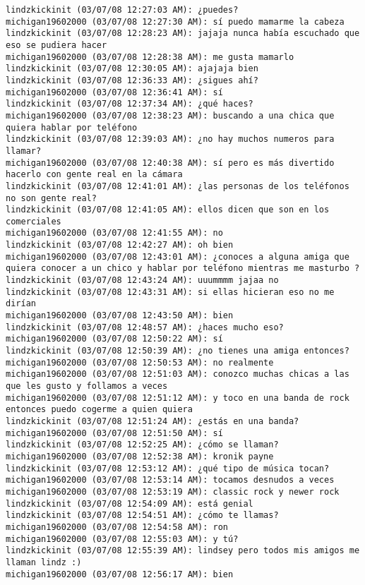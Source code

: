 \begin{verbatim}
lindzkickinit (03/07/08 12:27:03 AM): ¿puedes?
michigan19602000 (03/07/08 12:27:30 AM): sí puedo mamarme la cabeza
lindzkickinit (03/07/08 12:28:23 AM): jajaja nunca había escuchado que eso se pudiera hacer
michigan19602000 (03/07/08 12:28:38 AM): me gusta mamarlo
lindzkickinit (03/07/08 12:30:05 AM): ajajaja bien
lindzkickinit (03/07/08 12:36:33 AM): ¿sigues ahí?
michigan19602000 (03/07/08 12:36:41 AM): sí
lindzkickinit (03/07/08 12:37:34 AM): ¿qué haces?
michigan19602000 (03/07/08 12:38:23 AM): buscando a una chica que quiera hablar por teléfono
lindzkickinit (03/07/08 12:39:03 AM): ¿no hay muchos numeros para llamar?
michigan19602000 (03/07/08 12:40:38 AM): sí pero es más divertido hacerlo con gente real en la cámara
lindzkickinit (03/07/08 12:41:01 AM): ¿las personas de los teléfonos no son gente real?
lindzkickinit (03/07/08 12:41:05 AM): ellos dicen que son en los comerciales
michigan19602000 (03/07/08 12:41:55 AM): no
lindzkickinit (03/07/08 12:42:27 AM): oh bien
michigan19602000 (03/07/08 12:43:01 AM): ¿conoces a alguna amiga que quiera conocer a un chico y hablar por teléfono mientras me masturbo ? 
lindzkickinit (03/07/08 12:43:24 AM): uuummmm jajaa no
lindzkickinit (03/07/08 12:43:31 AM): si ellas hicieran eso no me dirían
michigan19602000 (03/07/08 12:43:50 AM): bien
lindzkickinit (03/07/08 12:48:57 AM): ¿haces mucho eso?
michigan19602000 (03/07/08 12:50:22 AM): sí
lindzkickinit (03/07/08 12:50:39 AM): ¿no tienes una amiga entonces?
michigan19602000 (03/07/08 12:50:53 AM): no realmente
michigan19602000 (03/07/08 12:51:03 AM): conozco muchas chicas a las que les gusto y follamos a veces
michigan19602000 (03/07/08 12:51:12 AM): y toco en una banda de rock entonces puedo cogerme a quien quiera 
lindzkickinit (03/07/08 12:51:24 AM): ¿estás en una banda?
michigan19602000 (03/07/08 12:51:50 AM): sí
lindzkickinit (03/07/08 12:52:25 AM): ¿cómo se llaman?
michigan19602000 (03/07/08 12:52:38 AM): kronik payne
lindzkickinit (03/07/08 12:53:12 AM): ¿qué tipo de música tocan?
michigan19602000 (03/07/08 12:53:14 AM): tocamos desnudos a veces
michigan19602000 (03/07/08 12:53:19 AM): classic rock y newer rock
lindzkickinit (03/07/08 12:54:09 AM): está genial
lindzkickinit (03/07/08 12:54:51 AM): ¿cómo te llamas?
michigan19602000 (03/07/08 12:54:58 AM): ron 
michigan19602000 (03/07/08 12:55:03 AM): y tú?
lindzkickinit (03/07/08 12:55:39 AM): lindsey pero todos mis amigos me llaman lindz :)
michigan19602000 (03/07/08 12:56:17 AM): bien
\end{verbatim}